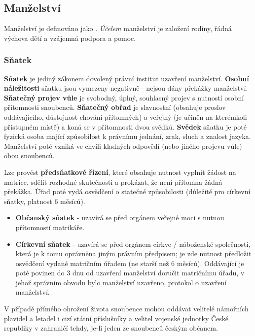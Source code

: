 \subsection{Manželství}

Manželství je definováno jako \textit{}. \textit{Účelem} manželství je založení rodiny, řádná výchova dětí a vzájemná podpora a pomoc.
 
\subsubsection{Sňatek}
 
\textbf{Sňatek} je jediný zákonem dovolený právní institut uzavření manželství. \textbf{Osobní náležitosti} sňatku jsou vymezeny negativně - nejsou dány překážky manželství. \textbf{Sňatečný projev vůle} je svobodný, úplný, souhlasný projev s nutností osobní přítomnosti snoubenců. \textbf{Sňatečný obřad }je slavnostní (obsahuje proslov oddávajícího, důstojnost chování přítomných) a veřejný (je učiněn na kterémkoli přístupném místě) a koná se v přítomnosti dvou svědků. \textbf{Svědek} sňatku je poté fyzická osoba mající způsobilost k právnímu jednání, zrak, sluch a znalost jazyka. Manželství poté vzniká ve chvíli kladných odpovědí (nebo jiného projevu vůle) obou snoubenců.

Lze provést \textbf{předsňatkové řízení}, které obsahuje nutnost vyplnit žádost na matrice, sdělit rozhodné skutečnosti a prokázat, že není přítomna žádná překážka. Úřad poté vydá osvědčení o statečné způsobilosti (důležité pro církevní sňatky, platnost 6 měsíců).

\begin{itemize}
    \item \textbf{Občanský sňatek} - uzavírá se před orgánem veřejné moci s nutnou přítomností matrikáře.
    \item \textbf{Církevní sňatek} - uzavírá se před orgánem církve / náboženské společnosti, která je k tomu oprávněna jiným právním předpisem; je zde nutnost předložit osvědčení vydané matričním úřadem (ne starší než 6 měsíců). Oddávající je poté povinen do 3 dnu od uzavření manželství doručit matričnímu úřadu, v jehož správním obvodu bylo manželství uzavřeno, protokol o uzavření manželství.
\end{itemize}
 
V případě přímého ohrožení života snoubence mohou oddávat velitelé námořních plavidel a letadel i cizí státní příslušníky a velitel vojenské jednotky České republiky v zahraničí tehdy, je-li jeden ze snoubenců českým občanem.

